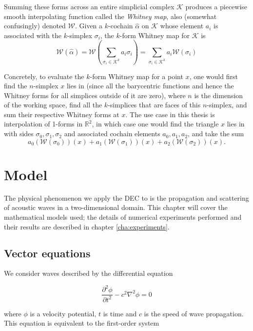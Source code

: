 \documentclass[utf8,english]{gradu3}
\begin{document}
Summing these forms across an entire simplicial complex $\mathcal{K}$
produces a piecewise smooth interpolating function called the \textit{Whitney map},
also (somewhat confusingly) denoted $\mathcal{W}$.
Given a $k$-cochain $\hat{\alpha}$ on $\mathcal{K}$ whose element $a_i$
is associated with the $k$-simplex $\sigma_i$,
the $k$-form Whitney map for $\mathcal{K}$ is
\begin{equation}
  \mathcal{W}(\hat{\alpha})
  = \mathcal{W}(\sum_{\sigma_i \in \mathcal{K}^k} a_i\sigma_i)
  = \sum_{\sigma_i \in \mathcal{K}^k} a_i \mathcal{W}(\sigma_i)
\end{equation}

Concretely, to evaluate the $k$-form Whitney map for a point $x$,
one would first find the $n$-simplex $x$ lies in
(since all the barycentric functions and hence the Whitney forms
for all simplices outside of it are zero),
where $n$ is the dimension of the working space,
find all the $k$-simplices that are faces of this $n$-simplex,
and sum their respective Whitney forms at $x$.
The use case in this thesis is interpolation of 1-forms in $\mathbb{R}^2$,
in which case one would find the triangle $x$ lies in
with sides $\sigma_0,\sigma_1,\sigma_2$
and associated cochain elements $a_0,a_1,a_2$,
and take the sum
\[
  a_0 (\mathcal{W}(\sigma_0))(x)
  + a_1 (\mathcal{W}(\sigma_1))(x)
  + a_2 (\mathcal{W}(\sigma_2))(x).
\]


\chapter{Model}\label{cha:model}

The physical phenomenon we apply the DEC to
is the propagation and scattering of acoustic waves
in a two-dimensional domain.
This chapter will cover the mathematical models used;
the details of numerical experiments performed and their results
are described in chapter \ref{cha:experiments}.

\section{Vector equations}

We consider waves described by the differential equation

\begin{equation}
  \frac{\partial^2 \phi}{\partial t^2} - c^2 \nabla^2\phi = 0
\end{equation}

where $\phi$ is a velocity potential, $t$ is time
and $c$ is the speed of wave propagation.
This equation is equivalent to the first-order system
\end{document}
